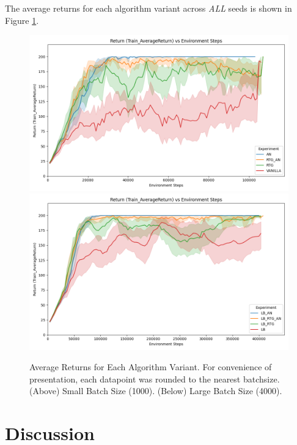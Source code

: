 \documentclass{article} %
\begin{document}
The average returns for each algorithm variant across \textit{ALL} seeds 
is shown in Figure \ref{fig:avg_returns}.
\begin{figure}[h]
    \centering
    \captionsetup{justification=centering}
    \includegraphics[scale = 0.6]{plots/return-vs-env-steps-small-batch.png}
    \includegraphics[scale = 0.6]{plots/return-vs-env-steps-large-batch.png}
    \caption{Average Returns for Each Algorithm Variant. For convenience of presentation, each datapoint was rounded to the nearest batchsize. \\ (Above) Small Batch Size (1000). (Below) Large Batch Size (4000).}
    \label{fig:avg_returns}
\end{figure}

\section{Discussion}
\end{document}
